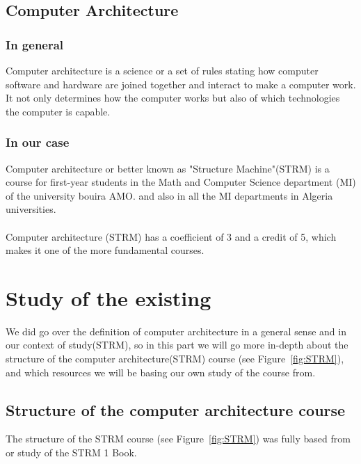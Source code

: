 \subsection{Computer Architecture}
\subsubsection{In general}
Computer architecture is a science or a set of rules stating how computer software and hardware are 
joined together and interact to make a computer work. It not only determines how the computer works 
but also of which technologies the computer is capable.\cite{Pam2018-so}
\subsubsection{In our case}
Computer architecture or better known as "Structure Machine"(STRM) is a course for first-year 
students in the Math and Computer Science department (MI) 
of the university bouira AMO. and also in all the MI departments in Algeria universities.\\ \\
\indent Computer architecture (STRM) has a coefficient of 3 and a credit of 5, which makes it one of the more fundamental courses.

\section{Study of the existing}
We did go over the definition of computer architecture in a general sense and in our context of study(STRM),
so in this part we will go more in-depth about the structure of the computer architecture(STRM) course (see Figure~\ref{fig:STRM}), and which resources we will be basing our own study of the course from.

\subsection{Structure of the computer architecture course}
The structure of the STRM course (see Figure~\ref{fig:STRM}) was fully based from or study of the STRM 1 Book\cite{STRM-1-Book-Taha-Zerrouki}.

